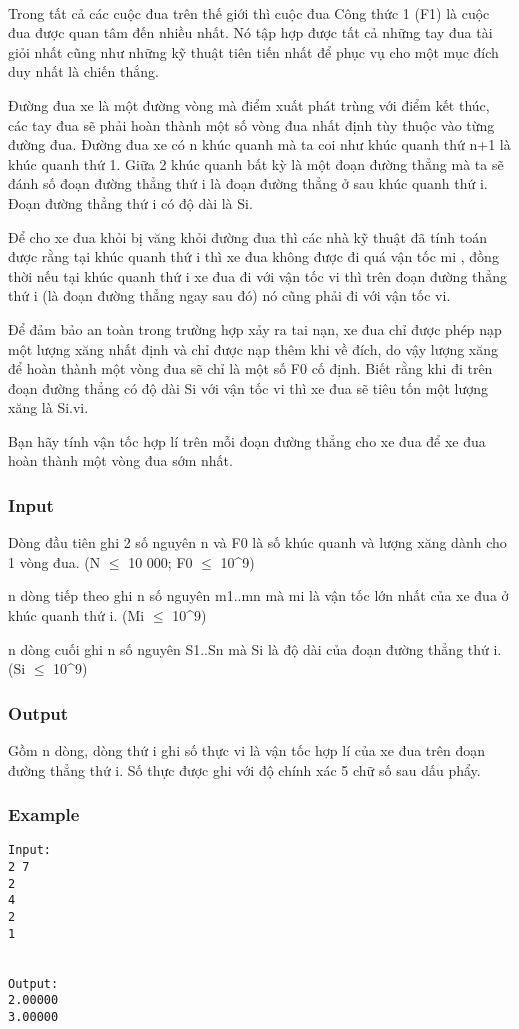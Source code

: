 

 

Trong tất cả các cuộc đua trên thế giới thì cuộc đua Công thức 1 (F1) là cuộc đua được quan tâm đến nhiều nhất. Nó tập hợp được tất cả những tay đua tài giỏi nhất cũng như những kỹ thuật tiên tiến nhất để phục vụ cho một mục đích duy nhất là chiến thắng.

Đường đua xe là một đường vòng mà điểm xuất phát trùng với điểm kết thúc, các tay đua sẽ phải hoàn thành một số vòng đua nhất định tùy thuộc vào từng đường đua. Đường đua xe có n khúc quanh mà ta coi như khúc quanh thứ n+1 là khúc quanh thứ 1. Giữa 2 khúc quanh bất kỳ là một đoạn đường thẳng mà ta sẽ đánh số đoạn đường thẳng thứ i là đoạn đường thẳng ở sau khúc quanh thứ i. Đoạn đường thẳng thứ i có độ dài là Si.

Để cho xe đua khỏi bị văng khỏi đường đua thì các nhà kỹ thuật đã tính toán được rằng tại khúc quanh thứ i thì xe đua không được đi quá vận tốc mi , đồng thời nếu tại khúc quanh thứ i xe đua đi với vận tốc vi thì trên đoạn đường thẳng thứ i (là đoạn đường thẳng ngay sau đó) nó cũng phải đi với vận tốc vi.

Để đảm bảo an toàn trong trường hợp xảy ra tai nạn, xe đua chỉ được phép nạp một lượng xăng nhất định và chỉ được nạp thêm khi về đích, do vậy lượng xăng để hoàn thành một vòng đua sẽ chỉ là một số F0 cố định. Biết rằng khi đi trên đoạn đường thẳng có độ dài Si với vận tốc vi thì xe đua sẽ tiêu tốn một lượng xăng là Si.vi.

Bạn hãy tính vận tốc hợp lí trên mỗi đoạn đường thẳng cho xe đua để xe đua hoàn thành một vòng đua sớm nhất.

\subsubsection{Input}

Dòng đầu tiên ghi 2 số nguyên n và F0 là số khúc quanh và lượng xăng dành cho 1 vòng đua. (N $\le$ 10 000; F0 $\le$ 10^9)

n dòng tiếp theo ghi n số nguyên m1..mn mà mi là vận tốc lớn nhất của xe đua ở khúc quanh thứ i. (Mi $\le$ 10^9)

n dòng cuối ghi n số nguyên S1..Sn mà Si là độ dài của đoạn đường thẳng thứ i. (Si $\le$ 10^9)

\subsubsection{Output}

Gồm n dòng, dòng thứ i ghi số thực vi là vận tốc hợp lí của xe đua trên đoạn đường thẳng thứ i. Số thực được ghi với độ chính xác 5 chữ số sau dấu phẩy.

\subsubsection{Example}
\begin{verbatim}
Input:
2 7
2 
4 
2
1


Output:
2.00000
3.00000
\end{verbatim}
